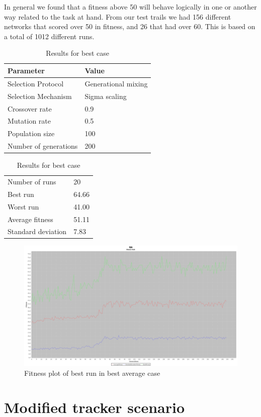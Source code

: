 \documentclass[10pt]{article}
\begin{document}
			In general we found that a fitness above 50 will behave logically in one or another way related to the task at hand. From our test trails we had 156 different networks that scored over 50 in fitness, and 26 that had over 60. This is based on a total of 1012 different runs. 
			\begin{table}[h]
				\parbox{.45\linewidth}{
					\centering
					\begin{tabular}{ll}
						Parameter & Value\\\hline
						Selection Protocol & Generational mixing\\
						Selection Mechanism & Sigma scaling\\
						Crossover rate & 0.9\\
						Mutation rate & 0.5\\
						Population size & 100\\
						Number of generations & 200
					\end{tabular}
					\caption{Parameters used to obtain best average case}
					\label{tab:resultAvoid}
				}
				\hfill
				\parbox{.45\linewidth}{
					\centering
					\begin{tabular}{ll}
						Number of runs & 20 \\
						Best run & 64.66\\
						Worst run & 41.00\\
						\hline
						Average fitness & 51.11\\
						Standard deviation & 7.83\\
					\end{tabular}
					\caption{Results for best case}
					\label{tab:resultAvoid}
				}
			\end{table}
			\begin{figure}%
				\centering
				\includegraphics[width=.7\columnwidth]{./../images/fitnessplot.png}%
				\caption{Fitness plot of best run in best average case}%
				\label{fig:best}%
			\end{figure}
\section{Modified tracker scenario}
\end{document}
